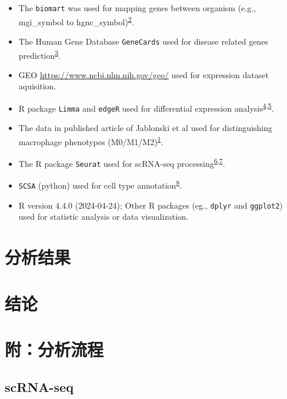 \documentclass[
]{article}
\providecommand{\tightlist}{%
  \setlength{\itemsep}{0pt}\setlength{\parskip}{0pt}}
\begin{document}
\begin{itemize}
\tightlist
\item
  The \texttt{biomart} was used for mapping genes between organism (e.g., mgi\_symbol to hgnc\_symbol)\textsuperscript{\protect\hyperlink{ref-MappingIdentifDurinc2009}{2}}.
\item
  The Human Gene Database \texttt{GeneCards} used for disease related genes prediction\textsuperscript{\protect\hyperlink{ref-TheGenecardsSStelze2016}{3}}.
\item
  GEO \url{https://www.ncbi.nlm.nih.gov/geo/} used for expression dataset aquisition.
\item
  R package \texttt{Limma} and \texttt{edgeR} used for differential expression analysis\textsuperscript{\protect\hyperlink{ref-LimmaPowersDiRitchi2015}{4},\protect\hyperlink{ref-EdgerDifferenChen}{5}}.
\item
  The data in published article of Jablonski et al used for distinguishing macrophage phenotypes (M0/M1/M2)\textsuperscript{\protect\hyperlink{ref-NovelMarkersTJablon2015}{1}}.
\item
  The R package \texttt{Seurat} used for scRNA-seq processing\textsuperscript{\protect\hyperlink{ref-IntegratedAnalHaoY2021}{6},\protect\hyperlink{ref-ComprehensiveIStuart2019}{7}}.
\item
  \texttt{SCSA} (python) used for cell type annotation\textsuperscript{\protect\hyperlink{ref-ScsaACellTyCaoY2020}{8}}.
\item
  R version 4.4.0 (2024-04-24); Other R packages (eg., \texttt{dplyr} and \texttt{ggplot2}) used for statistic analysis or data visualization.
\end{itemize}

\hypertarget{results}{%
\section{分析结果}\label{results}}

\hypertarget{dis}{%
\section{结论}\label{dis}}

\hypertarget{workflow}{%
\section{附：分析流程}\label{workflow}}

\hypertarget{scrna-seq}{%
\subsection{scRNA-seq}\label{scrna-seq}}
\end{document}
